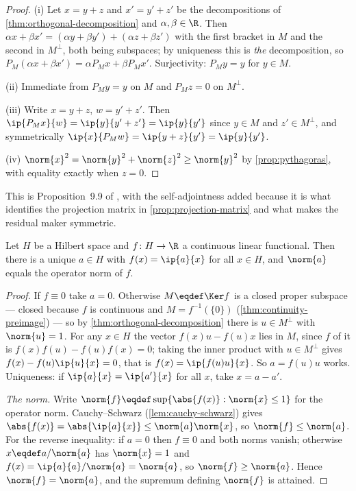 \begin{proof}
	(i) Let $x=y+z$ and $x'=y'+z'$ be the decompositions of
	\autoref{thm:orthogonal-decomposition} and $\alpha,\beta\in\R$. Then
	$\alpha x+\beta x'=(\alpha y+\beta y')+(\alpha z+\beta z')$ with the first
	bracket in $M$ and the second in $M^{\perp}$, both being subspaces; by
	uniqueness this is \emph{the} decomposition, so
	$P_M(\alpha x+\beta x')=\alpha P_Mx+\beta P_Mx'$. Surjectivity: $P_My=y$ for
	$y\in M$.

	(ii) Immediate from $P_My=y$ on $M$ and $P_Mz=0$ on $M^{\perp}$.

	(iii) Write $x=y+z$, $w=y'+z'$. Then
	$\ip{P_Mx}{w}=\ip{y}{y'+z'}=\ip{y}{y'}$ since $y\in M$ and $z'\in M^{\perp}$,
	and symmetrically $\ip{x}{P_Mw}=\ip{y+z}{y'}=\ip{y}{y'}$.

	(iv) $\norm{x}^2=\norm{y}^2+\norm{z}^2\geq\norm{y}^2$ by
	\autoref{prop:pythagoras}, with equality exactly when $z=0$.
\end{proof}

This is Proposition~9.9 of \textcite[p.~302]{fukuda2026notes}, with the
self-adjointness added because it is what identifies the projection matrix in
\autoref{prop:projection-matrix} and what makes the residual maker symmetric.

\begin{theorem}\label{thm:riesz-hilbert}
	Let $H$ be a Hilbert space and $f\colon H\to\R$ a continuous linear functional.
	Then there is a unique $a\in H$ with $f(x)=\ip{a}{x}$ for all $x\in H$, and
	$\norm{a}$ equals the operator norm of $f$.
\end{theorem}

\begin{proof}
	If $f\equiv0$ take $a=0$. Otherwise $M\eqdef\Ker f$ is a closed proper subspace
	--- closed because $f$ is continuous and $M=f^{-1}(\{0\})$
	(\autoref{thm:continuity-preimage}) --- so by
	\autoref{thm:orthogonal-decomposition} there is $u\in M^{\perp}$ with
	$\norm{u}=1$. For any $x\in H$ the vector $f(x)u-f(u)x$ lies in $M$, since $f$
	of it is $f(x)f(u)-f(u)f(x)=0$; taking the inner product with $u\in M^{\perp}$
	gives $f(x)-f(u)\ip{u}{x}=0$, that is $f(x)=\ip{f(u)u}{x}$. So $a=f(u)u$ works.
	Uniqueness: if $\ip{a}{x}=\ip{a'}{x}$ for all $x$, take $x=a-a'$.

	\emph{The norm.} Write $\norm{f}\eqdef\sup\{\abs{f(x)} : \norm{x}\leq1\}$ for
	the operator norm. Cauchy--Schwarz (\autoref{lem:cauchy-schwarz}) gives
	$\abs{f(x)}=\abs{\ip{a}{x}}\leq\norm{a}\norm{x}$, so
	$\norm{f}\leq\norm{a}$. For the reverse inequality: if $a=0$ then $f\equiv0$ and
	both norms vanish; otherwise $x\eqdef a/\norm{a}$ has $\norm{x}=1$ and
	$f(x)=\ip{a}{a}/\norm{a}=\norm{a}$, so $\norm{f}\geq\norm{a}$. Hence
	$\norm{f}=\norm{a}$, and the supremum defining $\norm{f}$ is attained.
\end{proof}

